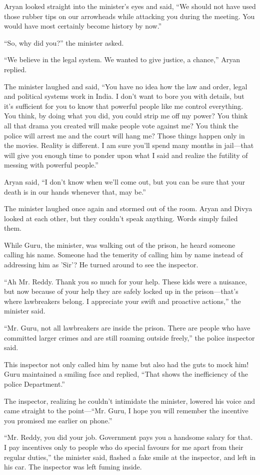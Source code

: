 Aryan looked straight into the minister's eyes and said, “We should not have
used those rubber tips on our arrowheads while attacking you during the meeting.
You would have most certainly become history by now.”

“So, why did you?” the minister asked.

“We believe in the legal system. We wanted to give justice, a chance,” Aryan
replied.

The minister laughed and said, “You have no idea how the law and order, legal
and political systems work in India. I don't want to bore you with details, but
it's sufficient for you to know that powerful people like me control everything.
You think, by doing what you did, you could strip me off my power? You think all
that drama you created will make people vote against me? You think the police
will arrest me and the court will hang me? Those things happen only in the
movies. Reality is different. I am sure you'll spend many months in jail—that
will give you enough time to ponder upon what I said and realize the futility of
messing with powerful people.”

Aryan said, “I don't know when we'll come out, but you can be sure that your
death is in our hands whenever that, may be.”

The minister laughed once again and stormed out of the room. Aryan and Divya
looked at each other, but they couldn't speak anything. Words simply failed them.

While Guru, the minister, was walking out of the prison, he heard someone
calling his name. Someone had the temerity of calling him by name instead of
addressing him as 'Sir'? He turned around to see the inspector.

“Ah Mr. Reddy. Thank you so much for your help. These kids were a nuisance, but
now because of your help they are safely locked up in the prison—that's where
lawbreakers belong. I appreciate your swift and proactive actions,” the
minister said.

“Mr. Guru, not all lawbreakers are inside the prison. There are people who have
committed larger crimes and are still roaming outside freely,” the police
inspector said.

This inspector not only called him by name but also had the guts to mock him!
Guru maintained a smiling face and replied, “That shows the inefficiency of the
police Department.”

The inspector, realizing he couldn't intimidate the minister, lowered his voice
and came straight to the point—“Mr. Guru, I hope you will remember the
incentive you promised me earlier on phone.”

“Mr. Reddy, you did your job. Government pays you a handsome salary for that. I
pay incentives only to people who do special favours for me apart from their
regular duties,” the minister said, flashed a fake smile at the inspector, and
left in his car. The inspector was left fuming inside.